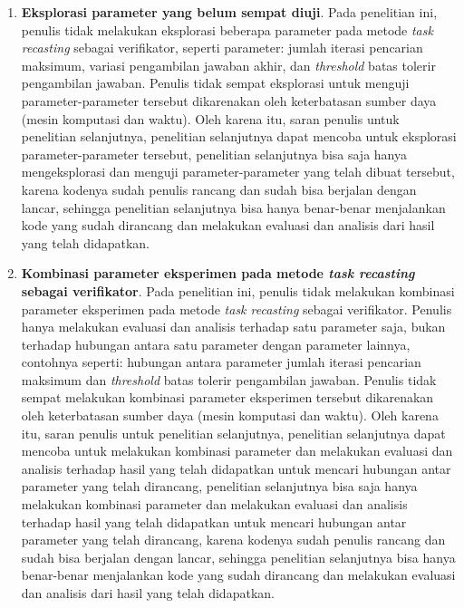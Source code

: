 \begin{enumerate}
    \item \textbf{Eksplorasi parameter yang belum sempat diuji}. Pada penelitian ini, penulis tidak melakukan eksplorasi beberapa parameter pada metode \emph{task recasting} sebagai verifikator, seperti parameter: jumlah iterasi pencarian maksimum, variasi pengambilan jawaban akhir, dan \emph{threshold} batas tolerir pengambilan jawaban. Penulis tidak sempat eksplorasi untuk menguji parameter-parameter tersebut dikarenakan oleh keterbatasan sumber daya (mesin komputasi dan waktu). Oleh karena itu, saran penulis untuk penelitian selanjutnya, penelitian selanjutnya dapat mencoba untuk eksplorasi parameter-parameter tersebut, penelitian selanjutnya bisa saja hanya mengeksplorasi dan menguji parameter-parameter yang telah dibuat tersebut, karena kodenya sudah penulis rancang dan sudah bisa berjalan dengan lancar, sehingga penelitian selanjutnya bisa hanya benar-benar menjalankan kode yang sudah dirancang dan melakukan evaluasi dan analisis dari hasil yang telah didapatkan.

    \item \textbf{Kombinasi parameter eksperimen pada metode \emph{task recasting} sebagai verifikator}. Pada penelitian ini, penulis tidak melakukan kombinasi parameter eksperimen pada metode \emph{task recasting} sebagai verifikator. Penulis hanya melakukan evaluasi dan analisis terhadap satu parameter saja, bukan terhadap hubungan antara satu parameter dengan parameter lainnya, contohnya seperti: hubungan antara parameter jumlah iterasi pencarian maksimum dan \emph{threshold} batas tolerir pengambilan jawaban. Penulis tidak sempat melakukan kombinasi parameter eksperimen tersebut dikarenakan oleh keterbatasan sumber daya (mesin komputasi dan waktu). Oleh karena itu, saran penulis untuk penelitian selanjutnya, penelitian selanjutnya dapat mencoba untuk melakukan kombinasi parameter dan melakukan evaluasi dan analisis terhadap hasil yang telah didapatkan untuk mencari hubungan antar parameter yang telah dirancang, penelitian selanjutnya bisa saja hanya melakukan kombinasi parameter dan melakukan evaluasi dan analisis terhadap hasil yang telah didapatkan untuk mencari hubungan antar parameter yang telah dirancang, karena kodenya sudah penulis rancang dan sudah bisa berjalan dengan lancar, sehingga penelitian selanjutnya bisa hanya benar-benar menjalankan kode yang sudah dirancang dan melakukan evaluasi dan analisis dari hasil yang telah didapatkan.
    

\end{enumerate}
